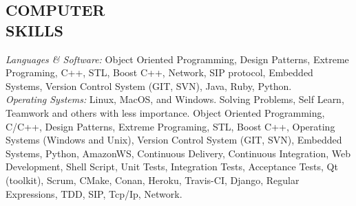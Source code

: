 \documentclass[line,margin]{res}
\begin{document}
\begin{resume}
\section{COMPUTER \\ SKILLS} {\sl Languages \& Software:} Object Oriented Programming, Design Patterns, Extreme Programing, C++, STL, Boost C++, Network, SIP protocol, Embedded Systems, Version Control System (GIT, SVN), Java, Ruby, Python. \\
                {\sl Operating Systems:} Linux, MacOS, and Windows.
                Solving Problems, Self Learn, Teamwork and others with less importance.
                Object Oriented Programming, C/C++, Design Patterns, Extreme Programing, STL, Boost C++, Operating Systems (Windows and Unix), Version Control System (GIT, SVN), Embedded Systems, Python, AmazonWS, Continuous Delivery, Continuous Integration, Web Development, Shell Script, Unit Tests, Integration Tests, Acceptance Tests, Qt (toolkit), Scrum, CMake, Conan, Heroku, Travis-CI, Django, Regular Expressions, TDD, SIP, Tcp/Ip, Network.

\end{resume}
\end{document}
